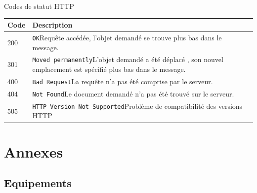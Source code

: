\documentclass[11pt,english,french]{scrreprt}
\theoremstyle{remark}
\theoremstyle{definition}
\begin{document}
Codes de statut HTTP

\begin{tabularx}{\linewidth}{lX}
	\toprule
	Code & Description\\
	\midrule
	200 & \lstinline!OK!\newline Requête accédée, l'objet demandé se trouve plus bas dans le message.\\
	301 & \lstinline!Moved permanently!\newline L'objet demandé a été déplacé , son nouvel emplacement est spécifié plus bas dans le message.\\
	400 & \lstinline!Bad Request!\newline La requête n'a pas été comprise par le serveur.\\
	404 & \lstinline!Not Found!\newline Le document demandé n'a pas été trouvé sur le serveur.\\
	505 & \lstinline!HTTP Version Not Supported!\newline Problème de compatibilité des versions HTTP\\
	\bottomrule 
\end{tabularx}


\chapter{Annexes} %

\section{Equipements} %
\end{document}
